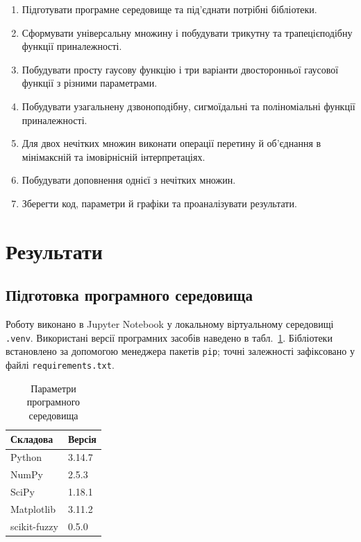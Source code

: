 \documentclass[12pt,a4paper]{article}
\begin{document}
  \begin{enumerate}[leftmargin=*,itemsep=0.25em]
    \item Підготувати програмне середовище та під'єднати потрібні бібліотеки.
    \item Сформувати універсальну множину і побудувати трикутну та
      трапецієподібну функції приналежності.
    \item Побудувати просту гаусову функцію і три варіанти двосторонньої
      гаусової функції з різними параметрами.
    \item Побудувати узагальнену дзвоноподібну, сигмоїдальні та поліноміальні
      функції приналежності.
    \item Для двох нечітких множин виконати операції перетину й об'єднання в
      мінімаксній та імовірнісній інтерпретаціях.
    \item Побудувати доповнення однієї з нечітких множин.
    \item Зберегти код, параметри й графіки та проаналізувати результати.
  \end{enumerate}

\section{Результати}

\subsection{Підготовка програмного середовища}

Роботу виконано в Jupyter Notebook у локальному віртуальному середовищі
\texttt{.venv}. Використані версії програмних засобів наведено в
табл.~\ref{tab:environment}. Бібліотеки встановлено за допомогою менеджера
пакетів \texttt{pip}; точні залежності зафіксовано у файлі
\texttt{requirements.txt}.

\begin{table}[H]
  \centering
  \renewcommand{\arraystretch}{1.18}
  \begin{tabular}{|l|l|}
    \hline
    \textbf{Складова} & \textbf{Версія} \\
    \hline
    Python & 3.14.7 \\ \hline
    NumPy & 2.5.3 \\ \hline
    SciPy & 1.18.1 \\ \hline
    Matplotlib & 3.11.2 \\ \hline
    scikit-fuzzy & 0.5.0 \\ \hline
  \end{tabular}
  \caption{Параметри програмного середовища}
  \label{tab:environment}
\end{table}
\end{document}
